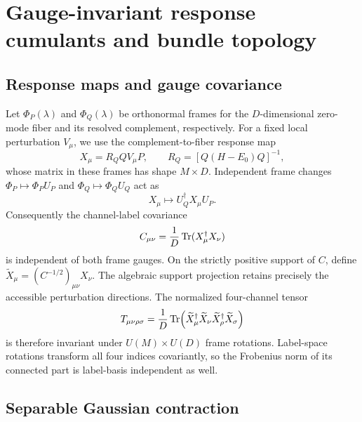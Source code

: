\section{Gauge-invariant response cumulants and bundle topology}
\label{app:matrix-topology}

\subsection{Response maps and gauge covariance}

Let \(\Phi_P(\lambda)\) and \(\Phi_Q(\lambda)\) be orthonormal frames for the \(D\)-dimensional zero-mode fiber and its resolved complement, respectively. For a fixed local perturbation \(V_\mu\), we use the complement-to-fiber response map
\begin{equation}
 X_\mu=R_Q QV_\mu P,\qquad R_Q=[Q(H-E_0)Q]^{-1},
 \label{eq:appendix-response-map}
\end{equation}
whose matrix in these frames has shape \(M\times D\). Independent frame changes \(\Phi_P\mapsto\Phi_PU_P\) and \(\Phi_Q\mapsto\Phi_QU_Q\) act as
\begin{equation}
 X_\mu\mapsto U_Q^\dagger X_\mu U_P.
 \label{eq:response-gauge-transformation}
\end{equation}
Consequently the channel-label covariance
\begin{equation}
 C_{\mu\nu}=\frac{1}{D}\operatorname{Tr}(X_\mu^\dagger X_\nu)
 \label{eq:channel-label-covariance}
\end{equation}
is independent of both frame gauges. On the strictly positive support of \(C\), define \(\widetilde X_\mu=(C^{-1/2})_{\mu\nu}X_\nu\). The algebraic support projection retains precisely the accessible perturbation directions. The normalized four-channel tensor
\begin{equation}
 T_{\mu\nu\rho\sigma}
 =\frac{1}{D}\operatorname{Tr}\!\left(
 \widetilde X_\mu^\dagger\widetilde X_\nu
 \widetilde X_\rho^\dagger\widetilde X_\sigma\right)
 \label{eq:invariant-four-channel-tensor}
\end{equation}
is therefore invariant under \(U(M)\times U(D)\) frame rotations. Label-space rotations transform all four indices covariantly, so the Frobenius norm of its connected part is label-basis independent as well.

\subsection{Separable Gaussian contraction}


